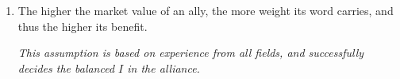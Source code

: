 \begin{enumerate}
\item
The higher the market value of an ally, the more weight its word carries, and thus the higher its benefit.

\textsl{This assumption is based on experience from all fields, and successfully decides the balanced $I$ in the alliance.}
\end{enumerate}